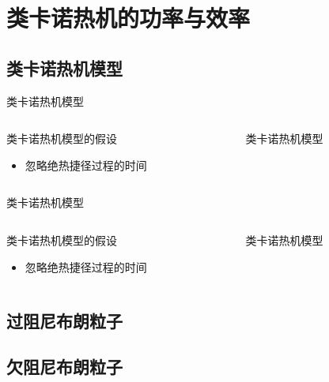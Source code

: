 \documentclass{beamer}
\begin{document}
\section{类卡诺热机的功率与效率}
\subsection{类卡诺热机模型}
\begin{frame}{类卡诺热机模型}
\begin{columns}
    \begin{column}{.6\textwidth}
        \begin{exampleblock}{类卡诺热机模型的假设}
        \begin{itemize}
        \item<2-> 忽略绝热捷径过程的时间 
        \end{itemize}
        \end{exampleblock}          
    \end{column}
    \begin{column}{.5\textwidth}
    \begin{figure}
        \centering
        \def\svgwidth{\columnwidth}
        
        \caption{类卡诺热机模型}
        \label{p3.1}
        \end{figure}
    \end{column}   
\end{columns}
\end{frame}

\begin{frame}{类卡诺热机模型}
    \begin{columns}
        \begin{column}{.6\textwidth}
            \begin{exampleblock}{类卡诺热机模型的假设}
            \begin{itemize}
            \item<2-> 忽略绝热捷径过程的时间 
            \end{itemize}
            \end{exampleblock}          
        \end{column}
        \begin{column}{.5\textwidth}
        \begin{figure}
            \centering
            \def\svgwidth{\columnwidth}
            
            \caption{类卡诺热机模型}
            \label{p3.1}
            \end{figure}
        \end{column}   
    \end{columns}
\end{frame}


\subsection{过阻尼布朗粒子}

\subsection{欠阻尼布朗粒子}


\footnotesize


\end{document}
